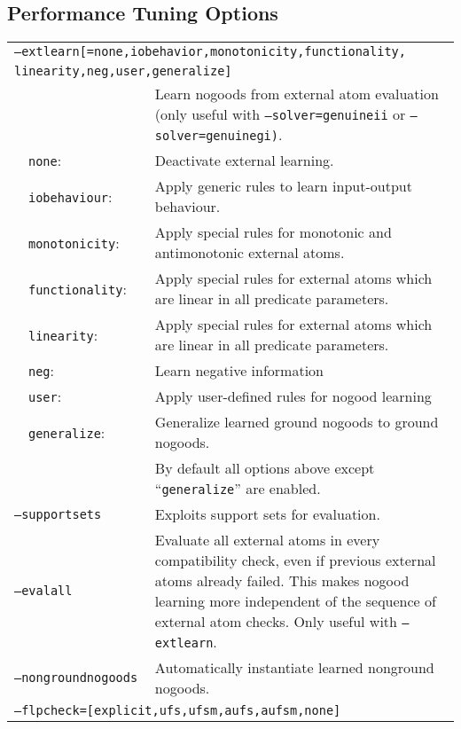 \documentclass[a4paper, titlepage]{article}
\begin{document}
\subsection{Performance Tuning Options}
\begin{longtable}{ p{2.0em} p{2.2cm} p{0.6cm} p{8.0cm} } 
\multicolumn{4}{p{6cm}}{\texttt{--extlearn[=none,iobehavior,monotonicity,functionality,}} \\[-1.5ex]
\multicolumn{4}{p{6cm}}{\texttt{\hphantom{--extlearn[}linearity,neg,user,generalize]}} \\

& & & Learn nogoods from external atom evaluation (only useful with \texttt{--solver=genuineii} or \texttt{--solver=genuinegi)}.\\
&\texttt{none}:& & Deactivate external learning. \\
&\texttt{iobehaviour}:& &Apply generic rules to learn input-output behaviour. \\
&\texttt{monotonicity}:& &Apply special rules for monotonic and antimonotonic external atoms.\\
&\texttt{functionality}:& &Apply special rules for external atoms which are linear in all predicate parameters.\\
&\texttt{linearity}:& &Apply special rules for external atoms which are linear in all predicate parameters.\\
&\texttt{neg}:& &Learn negative information\\
&\texttt{user}:& &Apply user-defined rules for nogood learning\\
&\texttt{generalize}:& &Generalize learned ground nogoods to ground nogoods.\\
& & & By default all options above except ``\texttt{generalize}'' are enabled.\\
\multicolumn{3}{l}{\texttt{--supportsets}} &
  Exploits support sets for evaluation.\\
\multicolumn{3}{l}{\texttt{--evalall}} &
  Evaluate all external atoms in every compatibility check, even if previous external atoms already failed.  This makes nogood learning more independent of the sequence of external atom checks. Only useful with \texttt{--extlearn}.\\
\multicolumn{3}{l}{\texttt{--nongroundnogoods}} &
Automatically instantiate learned nonground nogoods.\\
\multicolumn{4}{l}{\texttt{--flpcheck=[explicit,ufs,ufsm,aufs,aufsm,none]}} \\

\end{longtable}
\end{document}
